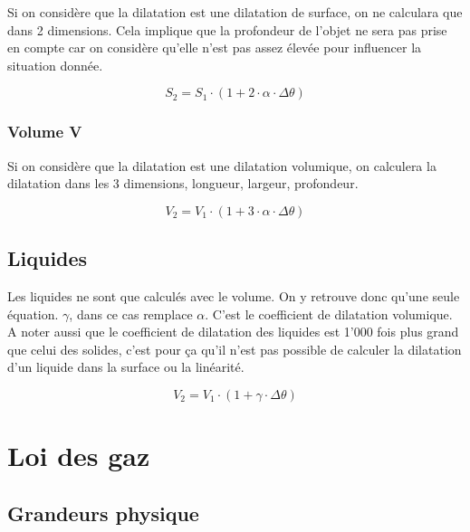 \documentclass{article}
\begin{document}
Si on considère que la dilatation est une dilatation de surface, on ne 
calculara que dans 2 dimensions. Cela implique que la profondeur de l'objet ne 
sera pas prise en compte car on considère qu'elle n'est pas assez élevée pour 
influencer la situation donnée.

\begin{equation}
  S_2 = S_1 \cdot (1 + 2 \cdot \alpha \cdot \Delta\theta)
\end{equation}

\subsubsection{Volume V}

Si on considère que la dilatation est une dilatation volumique, on calculera la dilatation dans les 3 dimensions, longueur, largeur, profondeur.

\begin{equation}
  V_2 = V_1 \cdot (1 + 3 \cdot \alpha \cdot \Delta\theta)
\end{equation}

\subsection{Liquides}

Les liquides ne sont que calculés avec le volume. On y retrouve donc qu'une 
seule équation.
\newline $\gamma$, dans ce cas remplace $\alpha$. C'est le coefficient de 
dilatation volumique.
\newline A noter aussi que le coefficient de dilatation des liquides est 1'000 
fois plus grand que celui des solides, c'est pour ça qu'il n'est pas possible 
de calculer la dilatation d'un liquide dans la surface ou la linéarité.

\begin{equation}
  V_2 = V_1 \cdot (1 + \gamma \cdot \Delta\theta)
\end{equation}

\pagebreak

\section{Loi des gaz}

\subsection{Grandeurs physique}
\end{document}
